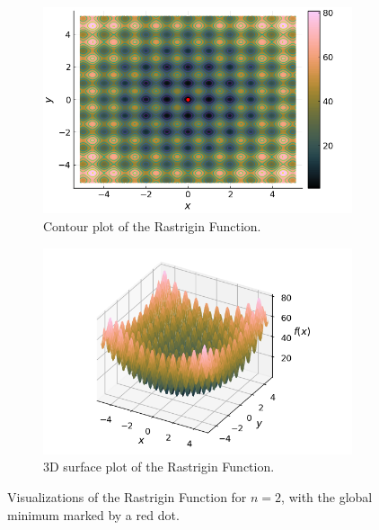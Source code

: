   \begin{figure}[ht!]
    \centering
    \begin{subfigure}[b]{0.45\textwidth}
      \centering
      \includegraphics[width=\textwidth]{img/test_functions/rastrigin_contour.png}
      \caption{Contour plot of the Rastrigin Function.}
      \label{fig:test_functions:rastrigin:contour}
    \end{subfigure}
    \begin{subfigure}[b]{0.45\textwidth}
      \centering
      \includegraphics[width=\textwidth]{img/test_functions/rastrigin_surface.png}
      \caption{3D surface plot of the Rastrigin Function.}
      \label{fig:test_functions:rastrigin:surface}
    \end{subfigure}
    \caption{
      Visualizations of the Rastrigin Function for \(n = 2\), with the global
      minimum marked by a red dot.
    }
    \label{fig:test_functions:rastrigin}
  \end{figure}
